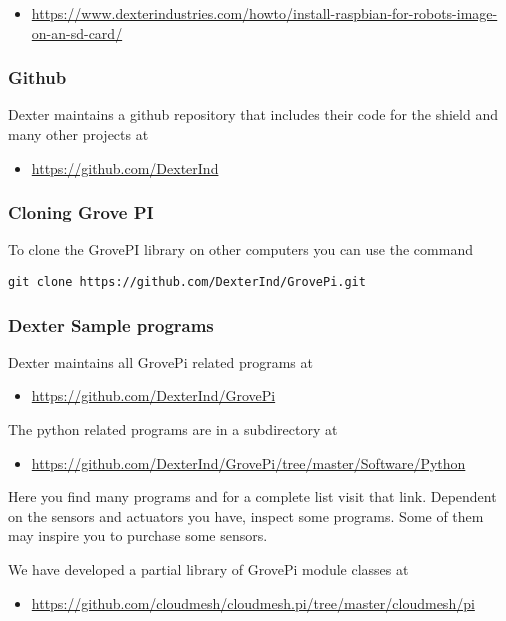 \begin{itemize}
\tightlist
\item
  \url{https://www.dexterindustries.com/howto/install-raspbian-for-robots-image-on-an-sd-card/}
\end{itemize}

\subsubsection{Github}\label{github}

Dexter maintains a github repository that includes their code for the
shield and many other projects at

\begin{itemize}
\tightlist
\item
  \url{https://github.com/DexterInd}
\end{itemize}

\subsubsection{Cloning Grove PI}\label{cloning-grove-pi}

To clone the GrovePI library on other computers you can use the command

\begin{verbatim}
git clone https://github.com/DexterInd/GrovePi.git
\end{verbatim}

\subsubsection{Dexter Sample programs}\label{dexter-sample-programs}

Dexter maintains all GrovePi related programs at

\begin{itemize}
\tightlist
\item
  \url{https://github.com/DexterInd/GrovePi}
\end{itemize}

The python related programs are in a subdirectory at

\begin{itemize}
\tightlist
\item
  \url{https://github.com/DexterInd/GrovePi/tree/master/Software/Python}
\end{itemize}

Here you find many programs and for a complete list visit that link.
Dependent on the sensors and actuators you have, inspect some programs.
Some of them may inspire you to purchase some sensors.

We have developed a partial library of GrovePi module classes at

\begin{itemize}
\tightlist
\item
  \url{https://github.com/cloudmesh/cloudmesh.pi/tree/master/cloudmesh/pi}
\end{itemize}
